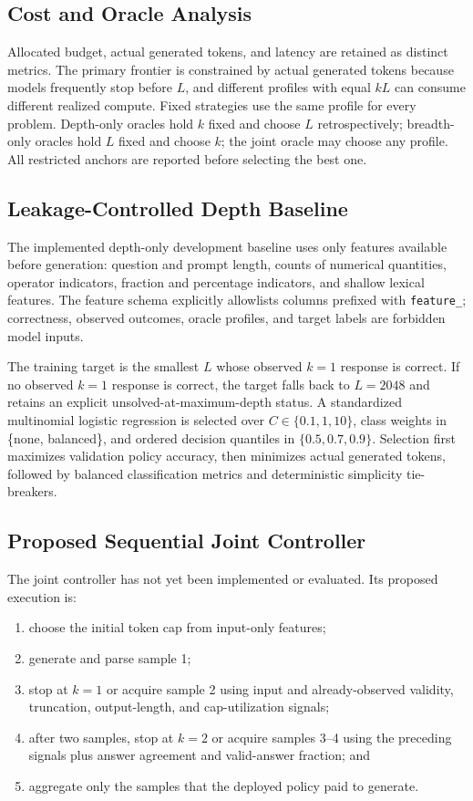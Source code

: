 \documentclass[runningheads]{llncs}
\begin{document}
\subsection{Cost and Oracle Analysis}

Allocated budget, actual generated tokens, and latency are retained as distinct
metrics. The primary frontier is constrained by actual generated tokens because
models frequently stop before $L$, and different profiles with equal $kL$ can
consume different realized compute. Fixed strategies use the same profile for
every problem. Depth-only oracles hold $k$ fixed and choose $L$ retrospectively;
breadth-only oracles hold $L$ fixed and choose $k$; the joint oracle may choose
any profile. All restricted anchors are reported before selecting the best one.

\subsection{Leakage-Controlled Depth Baseline}

The implemented depth-only development baseline uses only features available
before generation: question and prompt length, counts of numerical quantities,
operator indicators, fraction and percentage indicators, and shallow lexical
features. The feature schema explicitly allowlists columns prefixed with
\texttt{feature\_}; correctness, observed outcomes, oracle profiles, and target
labels are forbidden model inputs.

The training target is the smallest $L$ whose observed $k=1$ response is
correct. If no observed $k=1$ response is correct, the target falls back to
$L=2048$ and retains an explicit unsolved-at-maximum-depth status. A
standardized multinomial logistic regression is selected over
$C\in\{0.1,1,10\}$, class weights in \{none, balanced\}, and ordered
decision quantiles in $\{0.5,0.7,0.9\}$. Selection first maximizes validation
policy accuracy, then minimizes actual generated tokens, followed by balanced
classification metrics and deterministic simplicity tie-breakers.

\subsection{Proposed Sequential Joint Controller}

The joint controller has not yet been implemented or evaluated. Its proposed
execution is:
\begin{enumerate}
  \item choose the initial token cap from input-only features;
  \item generate and parse sample 1;
  \item stop at $k=1$ or acquire sample 2 using input and already-observed
  validity, truncation, output-length, and cap-utilization signals;
  \item after two samples, stop at $k=2$ or acquire samples 3--4 using the
  preceding signals plus answer agreement and valid-answer fraction; and
  \item aggregate only the samples that the deployed policy paid to generate.
\end{enumerate}
\end{document}
